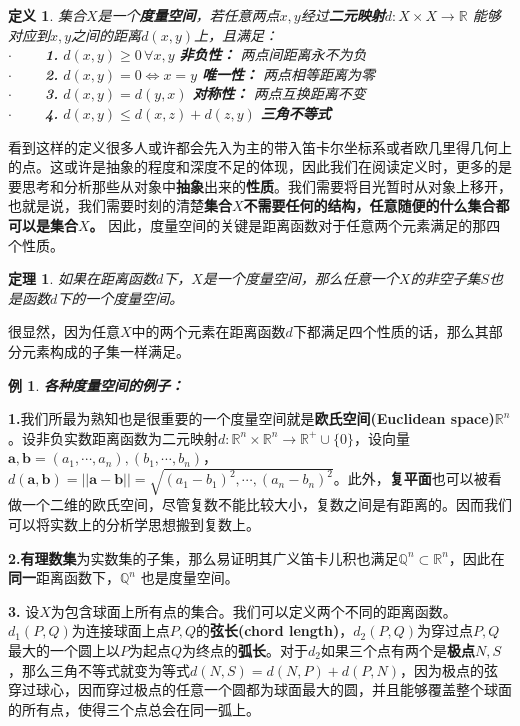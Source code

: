 \documentclass[mathserif,hyperref,UTF8,openany,b5paper]{ctexbook}
\newtheorem{exmp}{例}[section]
\newtheorem{defn}{定义}[section]
\newtheorem{thm}{定理}[section]
\begin{document}
\begin{defn}
集合$X$是一个\textbf{度量空间}，若任意两点$x,y$经过\textbf{二元映射}$d:X\times X \xrightarrow{}\mathbb{R}$ 能够对应到$x,y$之间的距离$d(x,y)$上，且满足：\\
$\cdot \qquad$ \textbf{1.} $d(x,y) \geq 0 \, \forall x,y $ \textbf{非负性：} 两点间距离永不为负\\
$\cdot \qquad$ \textbf{2.} $d(x,y)=0 \iff x=y$ \textbf{唯一性：} 两点相等距离为零\\
$\cdot \qquad$ \textbf{3.} $d(x,y)=d(y,x)$ \textbf{对称性：} 两点互换距离不变\\
$\cdot \qquad$ \textbf{4.} $d(x,y)\leq d(x,z)+d(z,y)$ \textbf{三角不等式} 
\end{defn}

看到这样的定义很多人或许都会先入为主的带入笛卡尔坐标系或者欧几里得几何上的点。这或许是抽象的程度和深度不足的体现，因此我们在阅读定义时，更多的是要思考和分析那些从对象中\textbf{抽象}出来的\textbf{性质}。我们需要将目光暂时从对象上移开，也就是说，我们需要时刻的清楚\textbf{集合$X$不需要任何的结构，任意随便的什么集合都可以是集合$X$。} 因此，度量空间的关键是距离函数对于任意两个元素满足的那四个性质。
\begin{thm}
如果在距离函数$d$下，$X$是一个度量空间，那么任意一个$X$的非空子集$S$也是函数$d$下的一个度量空间。
\end{thm}

很显然，因为任意$X$中的两个元素在距离函数$d$下都满足四个性质的话，那么其部分元素构成的子集一样满足。
\begin{exmp}\textbf{各种度量空间的例子：}\end{exmp}

\textbf{1.}我们所最为熟知也是很重要的一个度量空间就是\textbf{欧氏空间(Euclidean space)}$\mathbb{R}^n$。设非负实数距离函数为二元映射$d: \mathbb{R}^n \times \mathbb{R}^n \xrightarrow{} \mathbb{R}^+ \cup \{0\}$，设向量$\mathbf{a,b}=(a_1,\cdots,a_n),(b_1,\cdots,b_n)$，$d(\mathbf{a,b})=\mathbf{||a - b||}=\sqrt{(a_1-b_1)^2,\cdots,(a_n-b_n)^2}$。此外，\textbf{复平面}也可以被看做一个二维的欧氏空间，尽管复数不能比较大小，复数之间是有距离的。因而我们可以将实数上的分析学思想搬到复数上。

\textbf{2.}\textbf{有理数集}为实数集的子集，那么易证明其广义笛卡儿积也满足$\mathbb{Q}^n \subset \mathbb{R}^n$，因此在\textbf{同一}距离函数下，$\mathbb{Q}^n$ 也是度量空间。

\textbf{3.} 设$X$为包含球面上所有点的集合。我们可以定义两个不同的距离函数。$d_1(P,Q)$为连接球面上点$P,Q$的\textbf{弦长(chord length)}，$d_2(P,Q)$为穿过点$P,Q$最大的一个圆上以$P$为起点$Q$为终点的\textbf{弧长}。对于$d_2$如果三个点有两个是\textbf{极点}$N,S$，那么三角不等式就变为等式$d(N,S)=d(N,P)+d(P,N)$，因为极点的弦穿过球心，因而穿过极点的任意一个圆都为球面最大的圆，并且能够覆盖整个球面的所有点，使得三个点总会在同一弧上。
\end{document}
